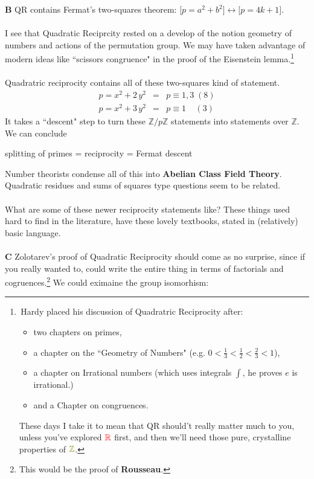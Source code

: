 \documentclass[12pt]{article}
\begin{document}
\noindent \textbf{B} QR contains Fermat's two-squares theorem: $\big[ p = a^2 + b^2 \big] \leftrightarrow \big[ p = 4k+1 \big] $. \\ \\
I see that Quadratic Reciprcity rested on a develop of the notion geometry of numbers and actions of the permutation group.  We may have taken advantage of modern ideas like ``scissors congruence" in the proof of the Eisenstein lemma.\footnote{\,Hardy placed his discussion of Quadratric Reciprocity after: 
\begin{itemize}
\item two chapters on primes, 
\item a chapter on the ``Geometry of Numbers" (e.g. $0 < \frac{1}{3} < \frac{1}{2} < \frac{2}{3} < 1 $), 
\item a chapter on Irrational numbers (which uses integrals $\int$, he proves $e$ is irrational.) 
\item and a Chapter on congruences.   
\end{itemize}
These days I take it to mean that QR should't really matter much to you, unless you've explored ${\color{red}\mathbb{R}}$ first, and then we'll need those pure, crystalline properties of ${\color{green!50!red}\mathbb{Z}}$.} \\ \\
Quadratric reciprocity contains all of these two-squares kind of statement. 
\begin{eqnarray*}
p = x^2 + 2\,y^2  &=& p \equiv 1, 3 \; (8)\\
p = x^2 + 3\,y^2 &=& p \equiv 1 \; \; \; \; (3)
\end{eqnarray*}
It takes a ``descent" step to turn these $\mathbb{Z}/p\mathbb{Z}$ statements into statements over $\mathbb{Z}$.  We can conclude
\begin{center}
splitting of primes = reciprocity = Fermat descent
\end{center}
Number theorists condense all of this into \textbf{Abelian Class Field Theory}.  Quadratic residues and sums of squares type questions seem to be related. \\ \\
What are some of these newer reciprocity statements like?  These things used hard to find in the literature, have these lovely textbooks, stated in (relatively) basic language. \\ \\
\textbf{C} Zolotarev's proof of Quadratic Reciprocity should come as no surprise, since if you really wanted to, could write the entire thing in terms of factorials and cogruences.\footnote{This would be the proof of \textbf{Rousseau}.}  We could eximaine the group isomorhism:
\end{document}
